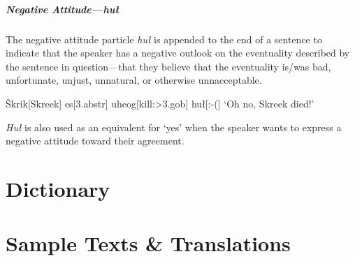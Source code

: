 \documentclass[a4paper,11pt,oneside,openany]{memoir}
\newcommand{\vS}{Š}
\begin{document}
\subsubsection{Negative Attitude---\textit{hu\l}}

The negative attitude particle \textit{hu\l} is appended to the end of a sentence to indicate that the speaker has a negative outlook on the eventuality described by the sentence in question---that they believe that the eventuality is/was bad, unfortunate, unjust, unnatural, or otherwise unnacceptable.

\ex 
\begingl
\vS krik[Skreek]
es[\sc 3.abstr]
uheog[kill:{\sc >3.gob}]
hu\l[:-{(}]
\glft `Oh no, Skreek died!'
\endgl
\xe

\textit{Hu\l} is also used as an equivalent for `yes' when the speaker wants to express a negative attitude toward their agreement.


\part{Dictionary}

\pagestyle{headings}
\nouppercaseheads



\part{Sample Texts \& Translations}
\end{document}
